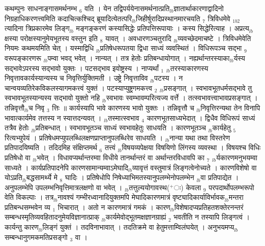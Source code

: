 \documentclass[article,12pt,a4paper]{memoir}%
\newcommand{\add}[1]{($^{+}$#1)}
\begin{document}
	  
	  \pstart \leavevmode%
	कथम्पुनः साधनाङ्गासमर्थनम्भ {\tiny $_{6}$} वति । येन तद्विपर्ययेनासमर्थनात्प्रति{\tiny $_{lb}$}ज्ञातार्थाकारणाद्वादिनो निग्रहाधिकरणत्त्वमिति कदाचित्कश्चिद् ब्रूयादित्येतत्परि{\tiny $_{lb}$}जिहीर्षुरादिप्रस्थानमारचयति {\tiny $_{7}$} {\color{DodgerBlue3}त्रिविधमेवे} {\tiny $_{1b2}$} त्यादिना त्रिप्रकारमेव लिङ्ग{\tiny $_{lb}$} \leavevmode{} मङ्गङ्करणं कस्यासिद्धेः प्रतिपत्तिरूपायाः । कस्य सिद्धेरित्याह । {\color{DodgerBlue3}अप्रत्य{\tiny $_{lb}$}क्षस्या} परोक्षस्यानुमेयभूतस्य वस्तुन इति {\tiny $_{8}$} यावत् । अवधारणञ्चतुरादि {\tiny $_{lb}$}व्यवच्छेदमाचष्टे । {\color{DodgerBlue3}त्रिविधमेवेति} नियमः कथमयमिति चेत् । यस्माद्विधि {\tiny $_{lb}$}प्रतिषेधरूपतया द्विधा साध्यं व्यवस्थितं । विधिरूपञ्च सद्भा {\tiny $_{9}$} \leavevmode{} वरूपङ्कारणरू {\tiny $_{lb}$}पम्वा भवद् भवेत् । नान्यत् । तत्र हेतोः प्रतिबन्धायोगात् । नह्यर्थान्तरस्याका{\tiny $_{lb}$}र्यस्य सद्भावेऽपरस्य सद्भावो युक्तः । पटसद्भाव इवोष्ट्रस्य । नाप्यर्थां {\tiny $_{1}$} {\tiny $_{lb}$}तरस्याकारणस्य निवृत्तावकार्यस्यान्यस्य च निवृत्तिर्युक्तिमती । उष्ट्रे निवृत्ताविव {\tiny $_{lb}$}पटस्य । न चान्वयव्यतिरेकविकलस्यागमकत्त्वं युक्तं । पटस्याप्युष्ट्रगमकत्त्व {\tiny $_{2}$} {\tiny $_{lb}$}प्रसङ्गात् । स्वभावभूतधर्मसद्भावे तु स्वभावभूतस्यान्यस्य सद्भावो युक्तो नहि {\tiny $_{lb}$}स्वभावः स्वम्भावम्परित्यज्य वर्त्ते । तत्स्वभावत्त्वाभावप्रसङ्गात् । तन्निवृत्तौ{\tiny $_{lb}$}च निवृ {\tiny $_{3}$} त्तिः ॥ कार्यस्यापि भावे कारणस्य भावो युक्तः । तन्निवृत्तौ च {\tiny $_{lb}$}निवृत्तिरन्यथा तेन विनापि भावात्कार्यमेव तत्तस्य न स्यात्तदन्यवत् । {\tiny $_{lb}$}तस्मात्स्वभाव {\tiny $_{4}$} कारणभूतसाध्यभेदात् । द्विधैव विधिरूपं साध्यं तत्रैव हेतोः {\tiny $_{lb}$}प्रतिबन्धात् । स्वभावभूतञ्च साध्यं स्वभावहेतुः साधयति । कारणभूतञ्च {\tiny $_{lb}$}कार्यहेतु {\tiny $_{5}$} रित्यभ्युपेयं । प्रतिषेधमप्युपलब्धिलक्षणप्राप्तानुपलब्धिरेव साधयति । {\tiny $_{lb}$}नान्या यथा तथा विस्तरेण प्रतिपादयिष्यति । तदिदमिह संक्षिप्तमर्थ {\tiny $_{6}$} तत्त्वं {\tiny $_{lb}$}विषयव्यपेक्षया विषयिणो लिंगस्य व्यवस्था । विषयश्च विधिः प्रतिषेधो वा {\tiny $_{lb}$}भवेत् । विधावप्यर्थान्तरम्वा विधीये तानर्थान्तरं वा अर्थान्तरविधावपि का {\tiny $_{7}$} {\tiny $_{lb}$}र्यकारणमनुभयम्वा साध्यते । कार्यप्रतिपादनेपि कारणसामान्यम्वाऽमेघादि{\tiny $_{lb}$}व्यावृत्तं वस्तुमात्रं लिङ्गत्वेनोच्यते । कारणविशेषो वा योऽप्रति{\tiny $_{lb}$}बद्धसामर्थ्ये मे {\tiny $_{8}$} घादिः । प्रतिषेधोपि निषेध्याभिमतस्यानुपलम्भेनोपलम्भेन {\tiny $_{lb}$}वा प्रतिपाद्येत । अनुपलम्भेपि उपलम्भनिवृत्तिमात्रलक्षणो वा भवेत् । {\tiny $_{lb}$}तत्तुल्ययोगावस्थ\add{ः} केवला {\tiny $_{9}$}\leavevmode{} परपदार्थोपलम्भरूपो वेति विकल्पाः । तत्र{\tiny $_{lb}$}नावश्यं गम्भीरध्वानादियुक्तमपि मेघादिकारणमात्रं वृष्ट्यादिकार्याविर्भावक{\tiny $_{lb}$}मन्तरा प्रतिबन्धसम्भवेन व्य {\tiny $_{1}$} भिचारात् । अतो न कारणमात्रं गमकं । कारण{\tiny $_{lb}$}विशेषादप्यप्रतिहतशक्तेरनन्तरं सम्बन्धस्मृतिव्यवहितादनुमेयविज्ञानात्प्राक् {\tiny $_{lb}$}कार्यमेवोद्भूतमक्षज्ञानग्राह्यं {\tiny $_{2}$} भवतीति न तस्यापि लिङ्गत्वं । कार्यन्तु कारण{\tiny $_{lb}$}लिङ्गं युक्तं । तदविनाभावात् । तदतिक्रमे वा हेतुमत्ताम्विलंघयेत् । अनुभयमप्य{\tiny $_{lb}$}सम्बन्धानुगमकमतिप्रसङ्गो {\tiny $_{3}$} वा । 
\end{document}
